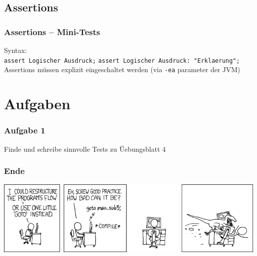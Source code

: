 \documentclass{beamer}
\begin{document}
\subsection{Assertions}
\begin{frame}[fragile]
\frametitle{Assertions -- Mini-Tests}
Syntax:\\
\verb|assert Logischer Ausdruck;|
\verb|assert Logischer Ausdruck: "Erklaerung";|\\
\pause
Assertions m\"{u}ssen explizit eingeschaltet werden (via \verb|-ea| parameter der JVM)
\end{frame}

\section{Aufgaben}
\begin{frame}
\frametitle{Aufgabe 1}
Finde und schreibe sinnvolle Tests zu \"{U}ebungsblatt 4
\end{frame}

\begin{frame}
\frametitle{Ende}
\includegraphics[scale=5.0]{goto.png}
\end{frame}
\end{document}
